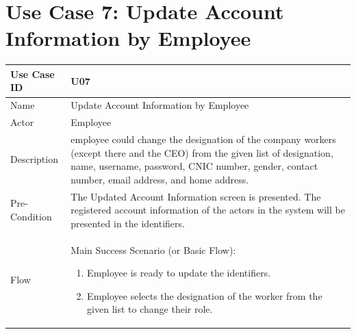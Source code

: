 \documentclass[12pt,a4paper]{report}
\begin{document}
\section{Use Case 7: Update Account Information by Employee}
\begin{tabular}{ | m{3cm} | m{12cm}| } \hline
Use Case ID & U07   \\\hline
Name  &  Update Account Information by Employee \\ \hline
Actor &    Employee \\ \hline
Description & employee could change the designation of the company workers (except there and the CEO) from the given list of designation, name, username, password, CNIC number, gender, contact number, email address, and home address.\\ \hline
Pre-Condition & The Updated Account Information screen is presented. The registered account information of the actors in the system will be presented in the identifiers.  \\\hline
Flow & Main Success Scenario (or Basic Flow):

\begin{enumerate}
\item Employee is ready to update the identifiers.   
\item Employee selects the designation of the worker from the given list to change their role. 
\end{enumerate}\\ \hline
\end{tabular}
\end{document}

